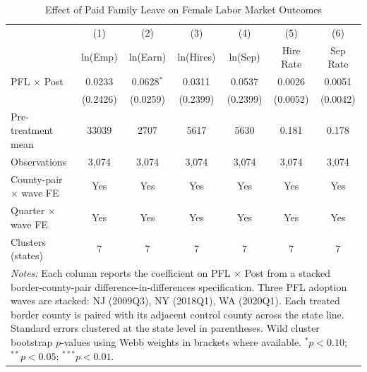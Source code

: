 \begin{table}[htbp]
\centering
\caption{Effect of Paid Family Leave on Female Labor Market Outcomes}
\label{tab:main}
\begin{tabular}{lcccccc}
\hline\hline
 & (1) & (2) & (3) & (4) & (5) & (6) \\
 & ln(Emp) & ln(Earn) & ln(Hires) & ln(Sep) & Hire Rate & Sep Rate \\
\hline
PFL $\times$ Post & 0.0233 & 0.0628$^{*}$ & 0.0311 & 0.0537 & 0.0026 & 0.0051 \\
 & (0.2426) & (0.0259) & (0.2399) & (0.2399) & (0.0052) & (0.0042) \\
\hline
Pre-treatment mean & 33039 & 2707 & 5617 & 5630 & 0.181 & 0.178 \\
Observations & 3,074 & 3,074 & 3,074 & 3,074 & 3,074 & 3,074 \\
County-pair $\times$ wave FE & Yes & Yes & Yes & Yes & Yes & Yes \\
Quarter $\times$ wave FE & Yes & Yes & Yes & Yes & Yes & Yes \\
Clusters (states) & 7 & 7 & 7 & 7 & 7 & 7 \\
\hline\hline
\multicolumn{7}{p{0.95\textwidth}}{\footnotesize \textit{Notes:} Each column reports the coefficient on PFL $\times$ Post from a stacked border-county-pair difference-in-differences specification. Three PFL adoption waves are stacked: NJ (2009Q3), NY (2018Q1), WA (2020Q1). Each treated border county is paired with its adjacent control county across the state line. Standard errors clustered at the state level in parentheses. Wild cluster bootstrap $p$-values using Webb weights in brackets where available. $^{*}p<0.10$; $^{**}p<0.05$; $^{***}p<0.01$.} \\
\end{tabular}
\end{table}
